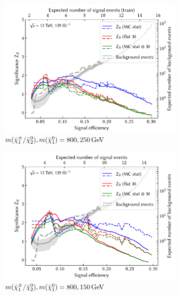 \begin{figure}[hb]
	\centering
	\begin{subfigure}[b]{0.5\linewidth}
		\centering\includegraphics[width=1.0\textwidth]{N-1_cut_scan/z_vs_effs_800_250.pdf}
		\caption{$m(\charg/\neutr), m(\lsp) =  800, \SI{250}{\GeV}$}
	\end{subfigure}\hfill
	\begin{subfigure}[b]{0.5\linewidth}
		\centering\includegraphics[width=1.0\textwidth]{N-1_cut_scan/z_vs_effs_800_150.pdf}
		\caption{$m(\charg/\neutr), m(\lsp) =  800, \SI{150}{\GeV}$}
	\end{subfigure}\hfill
	\par\bigskip
	\begin{subfigure}[b]{0.5\linewidth}

\end{subfigure}
\end{figure}
